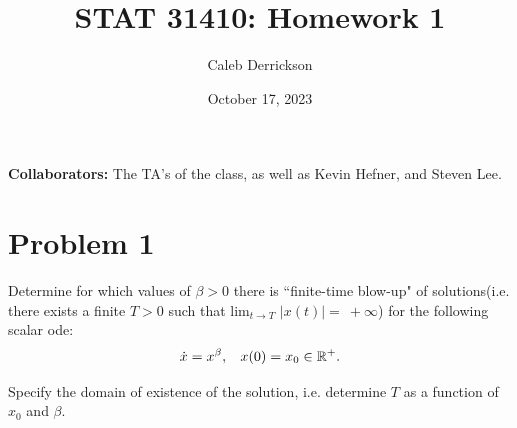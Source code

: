 

\title{STAT 31410: Homework 1}
\author{Caleb Derrickson}
\date{October 17, 2023}


\onehalfspacing
\maketitle

{\color{cit}\vspace{2mm}\noindent\textbf{Collaborators:}} The TA's of the class, as well as Kevin Hefner, and Steven Lee.

\tableofcontents

\newpage

\section{Problem 1}
Determine for which values of $\beta > 0$ there is ``finite-time blow-up" of solutions(i.e. there exists a finite $T > 0$ such that lim$_{t \rightarrow T}$ $\lvert x(t) \rvert = \ + \infty$) for the following scalar ode:
\[
\dot{x} = x^\beta, \hspace{3mm} x(0) = x_0 \in \mathbb{R}^+.
\]

Specify the domain of existence of the solution, i.e. determine $T$ as a function of $x_0$ and $\beta$.

